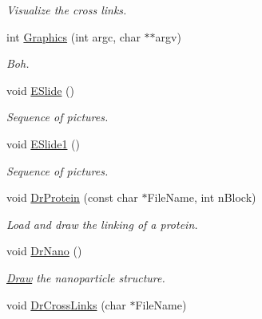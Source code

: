 \begin{DoxyCompactItemize}
\begin{DoxyCompactList}\small\item\em \-Visualize the cross links. \end{DoxyCompactList}\item 
\hypertarget{classElPoly_a7411c318f14258f65a45ba2572697aa2}{int \hyperlink{classElPoly_a7411c318f14258f65a45ba2572697aa2}{\-Graphics} (int argc, char $\ast$$\ast$argv)}\label{classElPoly_a7411c318f14258f65a45ba2572697aa2}

\begin{DoxyCompactList}\small\item\em \-Boh. \end{DoxyCompactList}\item 
\hypertarget{classElPoly_aefdc3015aefee9868dcb006c9e0832a7}{void \hyperlink{classElPoly_aefdc3015aefee9868dcb006c9e0832a7}{\-E\-Slide} ()}\label{classElPoly_aefdc3015aefee9868dcb006c9e0832a7}

\begin{DoxyCompactList}\small\item\em \-Sequence of pictures. \end{DoxyCompactList}\item 
\hypertarget{classElPoly_a6a2fcfb542bf2fb11d876bf91caa4625}{void \hyperlink{classElPoly_a6a2fcfb542bf2fb11d876bf91caa4625}{\-E\-Slide1} ()}\label{classElPoly_a6a2fcfb542bf2fb11d876bf91caa4625}

\begin{DoxyCompactList}\small\item\em \-Sequence of pictures. \end{DoxyCompactList}\item 
\hypertarget{classElPoly_aebd566fd1ad758de2396c7fbae4b9513}{void \hyperlink{classElPoly_aebd566fd1ad758de2396c7fbae4b9513}{\-Dr\-Protein} (const char $\ast$\-File\-Name, int n\-Block)}\label{classElPoly_aebd566fd1ad758de2396c7fbae4b9513}

\begin{DoxyCompactList}\small\item\em \-Load and draw the linking of a protein. \end{DoxyCompactList}\item 
\hypertarget{classElPoly_ae275d0b38624e312933078176e3af3dc}{void \hyperlink{classElPoly_ae275d0b38624e312933078176e3af3dc}{\-Dr\-Nano} ()}\label{classElPoly_ae275d0b38624e312933078176e3af3dc}

\begin{DoxyCompactList}\small\item\em \hyperlink{classDraw}{\-Draw} the nanoparticle structure. \end{DoxyCompactList}\item 
\hypertarget{classElPoly_aa295400ea854251339f20cdb30dd9ac0}{void \hyperlink{classElPoly_aa295400ea854251339f20cdb30dd9ac0}{\-Dr\-Cross\-Links} (char $\ast$\-File\-Name)}\label{classElPoly_aa295400ea854251339f20cdb30dd9ac0}


\end{DoxyCompactItemize}
